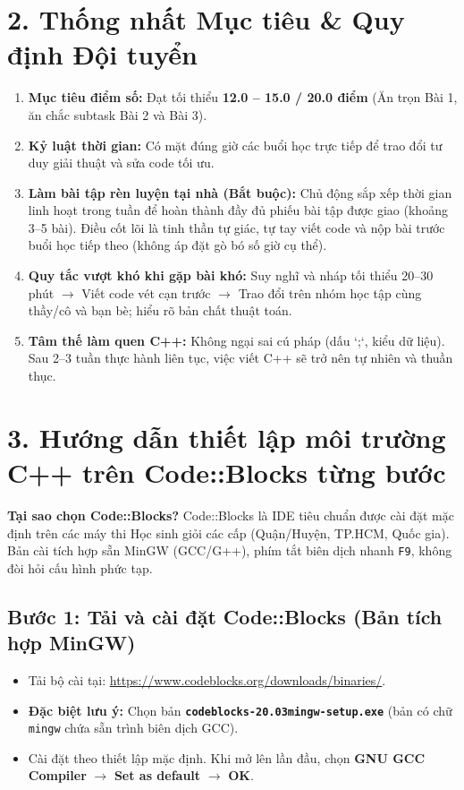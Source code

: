 \documentclass[11pt,a4paper]{article}
\begin{document}
\section*{\color{AsianDarkBlue}\normalsize 2. Thống nhất Mục tiêu \& Quy định Đội tuyển}
\begin{enumerate}
    \setlength{\itemsep}{2pt}
    \small
    \item \textbf{Mục tiêu điểm số:} Đạt tối thiểu \textbf{12.0 -- 15.0 / 20.0 điểm} (Ăn trọn Bài 1, ăn chắc subtask Bài 2 và Bài 3).
    \item \textbf{Kỷ luật thời gian:} Có mặt đúng giờ các buổi học trực tiếp để trao đổi tư duy giải thuật và sửa code tối ưu.
    \item \textbf{Làm bài tập rèn luyện tại nhà (Bắt buộc):} Chủ động sắp xếp thời gian linh hoạt trong tuần để hoàn thành đầy đủ phiếu bài tập được giao (khoảng 3--5 bài). Điều cốt lõi là tinh thần tự giác, tự tay viết code và nộp bài trước buổi học tiếp theo (không áp đặt gò bó số giờ cụ thể).
    \item \textbf{Quy tắc vượt khó khi gặp bài khó:} Suy nghĩ và nháp tối thiểu 20--30 phút $\to$ Viết code vét cạn trước $\to$ Trao đổi trên nhóm học tập cùng thầy/cô và bạn bè; hiểu rõ bản chất thuật toán.
    \item \textbf{Tâm thế làm quen C++:} Không ngại sai cú pháp (dấu `;`, kiểu dữ liệu). Sau 2--3 tuần thực hành liên tục, việc viết C++ sẽ trở nên tự nhiên và thuần thục.
\end{enumerate}

\newpage

\section*{\color{AsianDarkBlue}\normalsize 3. Hướng dẫn thiết lập môi trường C++ trên Code::Blocks từng bước}

\begin{tcolorbox}[colback=AsianLightBlue,colframe=AsianBlue,arc=1mm,boxrule=0.5pt]
\footnotesize\textbf{Tại sao chọn Code::Blocks?} Code::Blocks là IDE tiêu chuẩn được cài đặt mặc định trên các máy thi Học sinh giỏi các cấp (Quận/Huyện, TP.HCM, Quốc gia). Bản cài tích hợp sẵn MinGW (GCC/G++), phím tắt biên dịch nhanh \texttt{F9}, không đòi hỏi cấu hình phức tạp.
\end{tcolorbox}

\subsection*{\color{AsianBlue}\small Bước 1: Tải và cài đặt Code::Blocks (Bản tích hợp MinGW)}
\begin{itemize}
    \setlength{\itemsep}{1.5pt}
    \small
    \item Tải bộ cài tại: \url{https://www.codeblocks.org/downloads/binaries/}.
    \item \textbf{Đặc biệt lưu ý:} Chọn bản \textbf{\texttt{codeblocks-20.03mingw-setup.exe}} (bản có chữ \texttt{mingw} chứa sẵn trình biên dịch GCC).
    \item Cài đặt theo thiết lập mặc định. Khi mở lên lần đầu, chọn \textbf{GNU GCC Compiler} $\to$ \textbf{Set as default} $\to$ \textbf{OK}.
\end{itemize}
\end{document}
